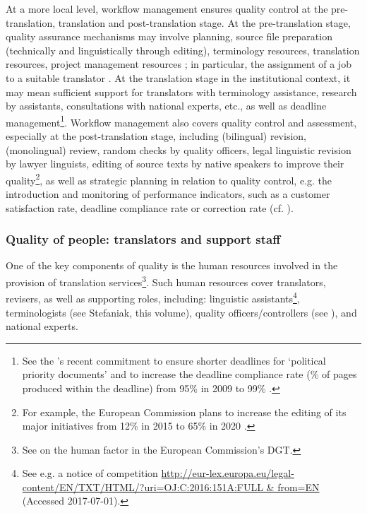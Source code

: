 \documentclass[output=paper]{langsci/langscibook}
\begin{document}
At a more local level, workflow management ensures quality control at the pre-translation, translation and post-translation stage. At the pre-translation stage, quality assurance mechanisms may involve planning, source file preparation (technically and linguistically through editing), terminology resources, translation resources, project management resources \citep[77-79]{Drugan2013}; in particular, the assignment of a job to a suitable translator \citep[23]{PrietoRamos2015}. At the translation stage in the institutional context, it may mean sufficient support for translators with terminology assistance, research by assistants, consultations with national experts, etc., as well as deadline management\footnote{See the \citeauthor{DGT2016b}’s recent commitment to ensure shorter deadlines for ‘political priority documents’ and to increase the deadline compliance rate (\% of pages produced within the deadline) from 95\% in 2009 to 99\% \citep[6, 9]{DGT2016b}.}. Workflow management also covers quality control and assessment, especially at the post-translation stage, including (bilingual) revision, (monolingual) review, random checks by quality officers, legal linguistic revision by lawyer linguists, editing of source texts by native speakers to improve their quality\footnote{For example, the European Commission plans to increase the editing of its major initiatives from 12\% in 2015 to 65\% in 2020 \citep{DGT2016b}.}, as well as strategic planning in relation to quality control, e.g. the introduction and monitoring of performance indicators, such as a customer satisfaction rate, deadline compliance rate or correction rate (cf. \citealt{DGT2016b}). 

\subsubsection{Quality of people: translators and support staff}\label{sec:biel:3.2.3 }

One of the key components of quality is the human resources involved in the provision of translation services\footnote{See \citet{Svoboda2008} on the human factor in the European Commission’s DGT.}. Such human resources cover translators, revisers, as well as supporting roles, including: linguistic assistants\footnote{See e.g. a notice of competition \url{http://eur-lex.europa.eu/legal-content/EN/TXT/HTML/?uri=OJ:C:2016:151A:FULL & from=EN} (Accessed 2017-07-01).}, terminologists (see Stefaniak, this volume), quality officers/controllers (see \citealt{DruganEtAlforthcoming}), and national experts. 
\end{document}
